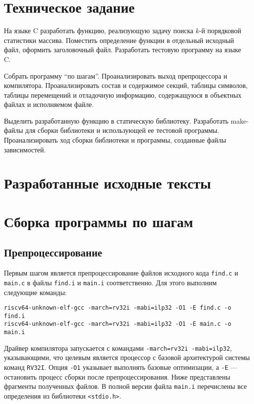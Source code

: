     \section{Техническое задание}\label{sec:task}
    На языке C разработать функцию, реализующую задачу поиска $k$-й порядковой статистики массива.
    Поместить определение функции в отдельный исходный файл, оформить заголовочный файл.
    Разработать тестовую программу на языке C.

    Собрать программу ``по шагам''.
    Проанализировать выход препроцессора и компилятора.
    Проанализировать состав и содержимое секций, таблицы символов, таблицы перемещений и отладочную информацию, содержащуюся в объектных файлах и исполняемом файле.

    Выделить разработанную функцию в статическую библиотеку.
    Разработать make-файлы для сборки библиотеки и использующей ее тестовой программы.
    Проанализировать ход сборки библиотеки и программы, созданные файлы зависимостей.

    \section{Разработанные исходные тексты}\label{sec:listings}
    
    
    

    \section{Сборка программы по шагам}\label{sec:stepbystep}
    \subsection{Препроцессирование}\label{subsec:preprocessing}
    Первым шагом является препроцессирование файлов исходного кода \verb|find.c| и \verb|main.c| в файлы \verb|find.i| и \verb|main.i| соответственно. Для этого выполним следующие команды:
    \begin{Verbatim}[breaklines=true]
riscv64-unknown-elf-gcc -march=rv32i -mabi=ilp32 -O1 -E find.c -o find.i
riscv64-unknown-elf-gcc -march=rv32i -mabi=ilp32 -O1 -E main.c -o main.i
    \end{Verbatim}
    Драйвер компилятора запускается с командами \verb|-march=rv32i -mabi=ilp32|, указывающими, что целевым является процессор с базовой архитектурой системы команд \verb|RV32I|.
    Опция \verb|-O1| указывает выполнять базовые оптимизации, а \verb|-E| — остановить процесс сборки после препроцессирования.
    Ниже представлены фрагменты полученных файлов. В полной версии файла \verb|main.i| перечислены все определения из библиотеки \verb|<stdio.h>|.
    \newpage

